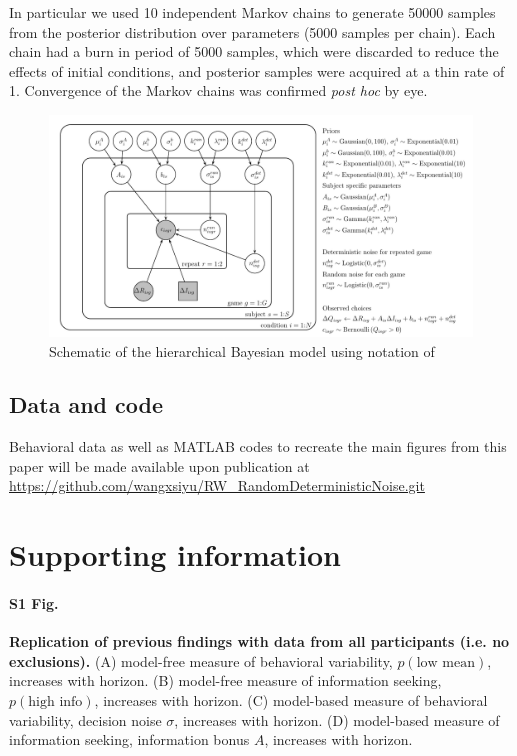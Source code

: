 \documentclass[12pt]{article}
\begin{document}
{In particular we used 10 independent Markov chains to generate 50000 samples from the posterior distribution over parameters (5000 samples per chain).  Each chain had a burn in period of 5000 samples, which were discarded to reduce the effects of initial conditions, and posterior samples were acquired at a thin rate of 1.  Convergence of the Markov chains was confirmed {\it post hoc} by eye. 

\begin{figure}[H]
\begin{center}
\includegraphics[width=1\textwidth]{figures/EEHorizon_2sigma.pdf}
\caption{Schematic of the hierarchical Bayesian model using notation of \cite{lee_wagenmakers_2014}}
\label{fig:model}
\end{center}
\end{figure}

\subsection*{Data and code}
Behavioral data as well as MATLAB codes to recreate the main figures from this paper will be made available upon publication at \url{https://github.com/wangxsiyu/RW_RandomDeterministicNoise.git} 



\section*{Supporting information}

\paragraph*{S1 Fig.}
\label{S1_Fig}
{\bf Replication of previous findings with data from all participants (i.e. no exclusions).} (A) model-free measure of behavioral variability, $p(\mbox{low mean})$, increases with horizon. (B) model-free measure of information seeking, $p(\mbox{high info})$, increases with horizon. (C) model-based measure of behavioral variability, decision noise $\sigma$, increases with horizon. (D) model-based measure of information seeking, information bonus $A$, increases with horizon.

}
\end{document}
